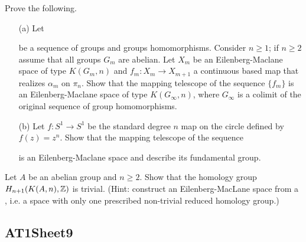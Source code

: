\label{exercise:AT1Sheet8.2}
Prove the following.
\begin{enumerate}
    \item[(a)] Let
    \begin{center}
\end{center}
be a sequence of groups and groups homomorphisms. Consider $n \geq 1$; if $n \geq 2$ assume that all groups $G_{m}$ are abelian. Let $X_{m}$ be an Eilenberg-Maclane space of type $K(G_{m}, n)$ and $f_{m}: X_{m} \rightarrow X_{m + 1}$ a continuous based map that realizes $\alpha_{m}$ on $\pi_{n}$. Show that the mapping telescope of the sequence $\{f_{m}\}$ is an Eilenberg-Maclane space of type $K(G_{\infty}, n)$, where $G_{\infty}$ is a colimit of the original sequence of group homomorphisms.
    \item[(b)] Let $f: S^{1} \rightarrow S^{1}$ be the standard degree $n$ map on the circle defined by $f(z) = z^{n}$. Show that the mapping telescope of the sequence
    \begin{center}
    \end{center}
    is an Eilenberg-Maclane space and describe its fundamental group.
\end{enumerate}

\begin{sketch}
\end{sketch}

\label{exercise:AT1Sheet8.3}
Let $A$ be an abelian group and $n\ge2$. Show that the homology group
$H_{n+1}(K(A,n),{\mathbb Z})$
is trivial. (Hint: construct an Eilenberg-MacLane space from a , i.e. a space with only one prescribed non-trivial reduced homology group.)

\begin{sketch}
\end{sketch}

\subsection{AT1Sheet9}

